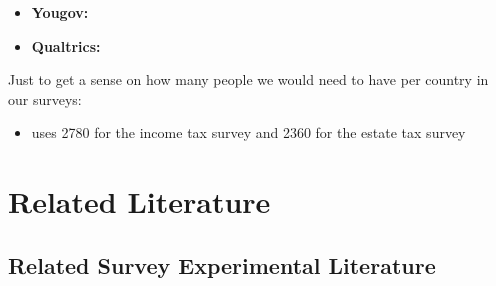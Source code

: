 \documentclass[a4paper, 12pt]{article}
\begin{document}
\begin{itemize}
    \begin{itemize}
        \item "We embedded our survey in the German Socio-Economic Panel (SOEP), a representative longitudinal study of German households. The SOEP contains an innovation sample (SOEP-IS) allowing researchers to implement tailor-made survey experiments. The surveys are administered by trained interviewers who visit respondents in their homes each year." (Fehr et al 2022)
        \item I am not sure yet if this innovation option still exists, because I can't find it on their website.
    \end{itemize}
    \item \textbf{Yougov:}
    \item \textbf{Qualtrics:}
    
    
\end{itemize}

Just to get a sense on how many people we would need to have per country in our surveys: 
\begin{itemize}
    \item \cite{stantcheva2021understanding} uses 2780 for the income tax survey and 2360 for the estate tax survey
\end{itemize}

\section{Related Literature}



\subsection{Related Survey Experimental Literature}
\end{document}
